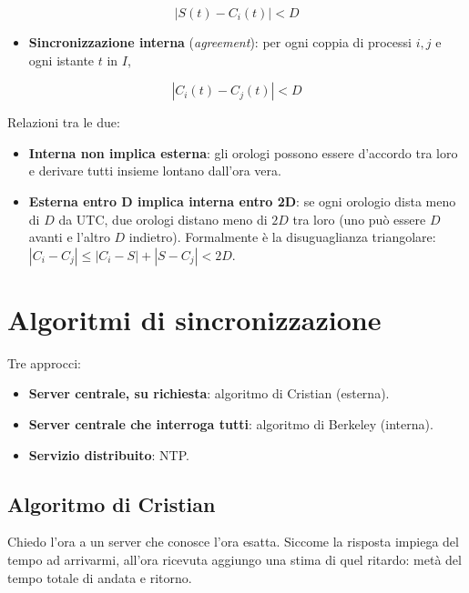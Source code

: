 \[
|S(t) - C_i(t)| < D
\]

\begin{itemize}
\tightlist
\item
  \textbf{Sincronizzazione interna} (\emph{agreement}): per ogni coppia di processi \(i, j\) e ogni istante \(t\) in \(I\),
\end{itemize}

\[
|C_i(t) - C_j(t)| < D
\]

Relazioni tra le due:

\begin{itemize}
\tightlist
\item
  \textbf{Interna non implica esterna}: gli orologi possono essere d'accordo tra loro e derivare tutti insieme lontano dall'ora vera.
\item
  \textbf{Esterna entro D implica interna entro 2D}: se ogni orologio dista meno di \(D\) da UTC, due orologi distano meno di \(2D\) tra loro (uno può essere \(D\) avanti e l'altro \(D\) indietro). Formalmente è la disuguaglianza triangolare: \(|C_i - C_j| \le |C_i - S| + |S - C_j| < 2D\).
\end{itemize}

\section{Algoritmi di sincronizzazione}

Tre approcci:

\begin{itemize}
\tightlist
\item
  \textbf{Server centrale, su richiesta}: algoritmo di Cristian (esterna).
\item
  \textbf{Server centrale che interroga tutti}: algoritmo di Berkeley (interna).
\item
  \textbf{Servizio distribuito}: NTP.
\end{itemize}

\subsection{Algoritmo di Cristian}

\begin{inbreve}

Chiedo l'ora a un server che conosce l'ora esatta. Siccome la risposta impiega del tempo ad arrivarmi, all'ora ricevuta aggiungo una stima di quel ritardo: metà del tempo totale di andata e ritorno.

\end{inbreve}

